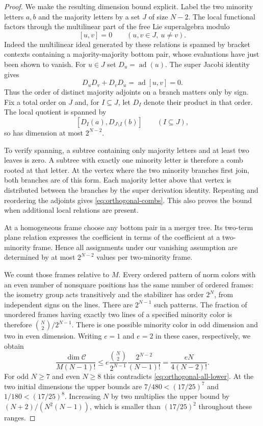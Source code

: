 \begin{proof}
We make the resulting dimension bound explicit.  Label the two
minority letters $a,b$ and the majority letters by a set $J$ of size
$N-2$.  The local functional factors through the multilinear part of
the free Lie superalgebra modulo
\[
 [u,v]=0\qquad(u,v\in J,\ u\ne v).
\]
Indeed the multilinear ideal generated by these relations is spanned
by bracket contexts containing a majority-majority bottom pair, whose
evaluations have just been shown to vanish.  For $u\in J$ set
$D_u=\operatorname{ad}(u)$.  The super Jacobi identity gives
\[
 D_uD_v+D_vD_u=\operatorname{ad}[u,v]=0.
\]
Thus the order of distinct majority adjoints on a branch matters only
by sign.  Fix a total order on $J$ and, for $I\subseteq J$, let $D_I$
denote their product in that order.  The local quotient is spanned by
\begin{equation}\label{eq:orthogonal-combs}
 [D_I(a),D_{J\setminus I}(b)]\qquad(I\subseteq J),
\end{equation}
so has dimension at most $2^{N-2}$.

To verify spanning, a subtree containing only majority letters and at
least two leaves is zero.  A subtree with exactly one minority letter
is therefore a comb rooted at that letter.  At the vertex where the
two minority branches first join, both branches are of this form.
Each majority letter above that vertex is distributed between the
branches by the super derivation identity.  Repeating and reordering
the adjoints gives \eqref{eq:orthogonal-combs}.  This also proves the
bound when additional local relations are present.

At a homogeneous frame choose any bottom pair in a merger tree.  Its
two-term plane relation expresses the coefficient in terms of the
coefficient at a two-minority frame.  Hence all assignments under our
vanishing assumption are determined by at most $2^{N-2}$ values per
two-minority frame.

We count those frames relative to $M$.  Every ordered pattern of norm
colors with an even number of nonsquare positions has the same number
of ordered frames: the isometry group acts transitively and the
stabilizer has order $2^N$, from independent signs on the lines.  There
are $2^{N-1}$ such patterns.  The fraction of unordered frames having
exactly two lines of a specified minority color is therefore
$\binom N2/2^{N-1}$.  There is one possible minority color in odd
dimension and two in even dimension.  Writing $e=1$ and $e=2$ in these
cases, respectively, we obtain
\begin{equation}\label{eq:orthogonal-excluded-upper}
 \frac{\dim\mathcal C}{M(N-1)!}
 \le
 e\frac{\binom N2}{2^{N-1}}
      \frac{2^{N-2}}{(N-1)!}
 =\frac{eN}{4(N-2)!}.
\end{equation}
For odd $N\ge7$ and even $N\ge8$ this contradicts
\eqref{eq:orthogonal-all-lower}.  At the two initial dimensions the
upper bounds are $7/480<(17/25)^7$ and $1/180<(17/25)^8$.
Increasing $N$ by two multiplies the upper bound by
$(N+2)/(N^2(N-1))$, which is smaller than $(17/25)^2$ throughout
these ranges.


\end{proof}
